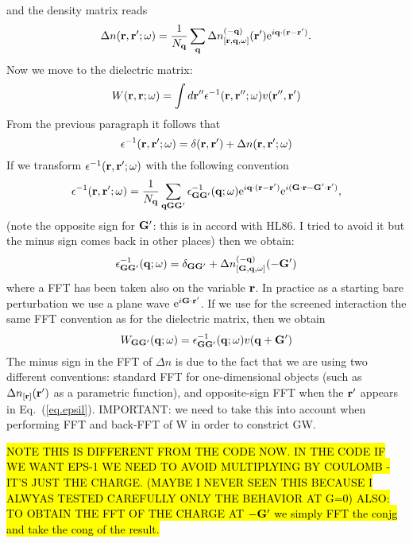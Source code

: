\documentclass[twocolumn,prb,showpacs,superscriptaddress]{revtex4}
\def\w{\omega}
\def\q{{\bf q}}
\def\G{{\bf G}}
\def\Gp{{\bf G^\prime}}
\def\r{{\bf r}}
\def\rp{{\bf r^\prime}}
\def\rpp{{\bf r^{\prime\prime}}}
\begin{document}
and the density matrix reads
  \begin{equation}
  \Delta n(\r,\rp;\w) = \frac{1}{N_\q} \sum_\q \Delta n_{[\r,\q,\w]}^{(-\q)}(\rp) {\rm e}^{i\q\cdot(\r-\rp)}.
  \end{equation}
Now we move to the dielectric matrix:
  \begin{equation}
  W(\r,\r;\w) = \int d\rpp \epsilon^{-1}(\r,\rpp;\w) v(\rpp,\rp)
  \end{equation}
From the previous paragraph it follows that
  \begin{equation}\label{eq.epsil}
  \epsilon^{-1}(\r,\rp;\w) = \delta(\r,\rp) + \Delta n(\r,\rp;\w)
  \end{equation}
If we transform $\epsilon^{-1}(\r,\rp;\w)$ with the following convention
  \begin{equation}
  \epsilon^{-1}(\r,\rp;\w) = \frac{1}{N_\q} \sum_{\q\G\Gp} \epsilon^{-1}_{\G\Gp}(\q;\w) 
  {\rm e}^{i\q\cdot(\r-\rp)} {\rm e}^{i(\G\cdot\r-\Gp\cdot\rp)},
  \end{equation}
(note the opposite sign for $\Gp$: this is in accord with HL86. I tried to avoid it
but the minus sign comes back in other places) then we obtain:
  \begin{equation}
  \epsilon^{-1}_{\G\Gp}(\q;\w) = \delta_{\G\Gp} + \Delta n_{[\G,\q,\w]}^{(-\q)}(-\Gp) 
  \end{equation}
where a FFT has been taken also on the variable $\r$. 
In practice as a starting bare perturbation we use a plane wave ${\rm e}^{i\G\cdot\rp}$.
If we use for the screened interaction the same FFT convention as for the dielectric
matrix, then we obtain
  \begin{equation}
  W_{\G\Gp}(\q;\w)  = \epsilon^{-1}_{\G\Gp}(\q;\w)  v(\q+\Gp)
  \end{equation}
The minus sign in the FFT of $\Delta n$ is due to the fact that we are using two
different conventions: standard FFT for one-dimensional objects (such as $\Delta n_{[\r]}(\rp)$
as a parametric function), and opposite-sign FFT when the $\rp$ appears in Eq.\ (\ref{eq.epsil}).
IMPORTANT: we need to take this into account when performing FFT and back-FFT of W in
order to constrict GW.

\hl{
NOTE THIS IS DIFFERENT FROM THE CODE NOW.
IN THE CODE IF WE WANT EPS-1 WE NEED TO AVOID MULTIPLYING BY COULOMB - IT'S JUST THE CHARGE.
(MAYBE I NEVER SEEN THIS BECAUSE I ALWYAS TESTED CAREFULLY ONLY THE BEHAVIOR AT G=0)
ALSO: TO OBTAIN THE FFT OF THE CHARGE AT $-\Gp$ we simply FFT the conjg and take the cong 
of the result.}
\end{document}
